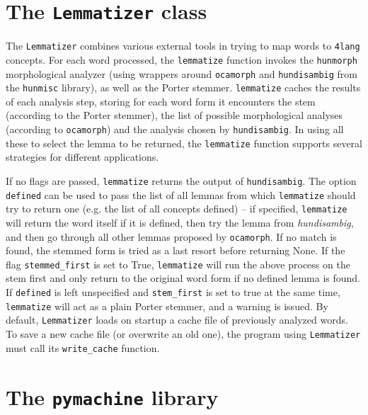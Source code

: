 \documentclass{article}
\newcommand{\fl}{\texttt{4lang}\xspace}
\begin{document}
\section{The \texttt{Lemmatizer} class}
\label{sec:lemmatizer}

The \texttt{Lemmatizer} combines various external tools in trying to map words
to \fl concepts. For each word processed, the \texttt{lemmatize} function
invokes the \texttt{hunmorph} morphological analyzer (using wrappers around
\texttt{ocamorph} and \texttt{hundisambig} from the \texttt{hunmisc} library),
as well as the Porter stemmer. \texttt{lemmatize} caches the results of each
analysis step, storing for each word form it encounters the stem (according to
the Porter stemmer), the list of possible morphological analyses (according to
\texttt{ocamorph}) and the analysis chosen by \texttt{hundisambig}. In using
all these to select the lemma to be returned, the \texttt{lemmatize} function
supports several strategies for different applications.

If no flags are passed, \texttt{lemmatize} returns the output of
\texttt{hundisambig}. The option \texttt{defined} can be used to pass the list
of all lemmas from which \texttt{lemmatize} should try to return one (e.g. the
list of all concepts defined) -- if specified, \texttt{lemmatize} will
return the word itself if it is defined, then try the lemma from
\textit{hundisambig}, and then go through all other lemmas proposed by
\texttt{ocamorph}. If no match is found, the stemmed form is tried as a last
resort before returning None. If the flag \texttt{stemmed\_first} is set to
True, \texttt{lemmatize} will run the above process on the stem first and only
return to the original word form if no defined lemma is found. If
\texttt{defined} is left unspecified and \texttt{stem\_first} is set to true
at the same time, \texttt{lemmatize} will act as a plain Porter stemmer, and a
warning is issued.
By default, \texttt{Lemmatizer} loads on startup a cache file of previously
analyzed words. To save a new cache file (or overwrite an old one), the program
using \texttt{Lemmatizer} must call its \texttt{write\_cache} function.

\section{The \texttt{pymachine} library}

\label{sec:pymachine}
\end{document}
